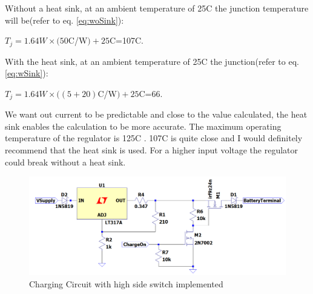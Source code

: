 Without a heat sink, at an ambient temperature of 25\textdegree C the junction temperature will be(refer to eq. \ref{eq:woSink}):

\begin{center}
$T_j=1.64W\times(50$\textdegree C/W$)+25$\textdegree C=107\textdegree C. 
\end{center}

With the heat sink, at an ambient temperature of 25\textdegree C the junction(refer to eq. \ref{eq:wSink}):
\begin{center}
    $T_j=1.64W\times((5+20)$\textdegree C/W$)+25$\textdegree C=66\textdegree.
\end{center}

We want out current to be predictable and close to the value calculated, the heat sink enables the calculation to be more accurate. The maximum operating temperature of the regulator is 125\textdegree C \cite{STM}. 107\textdegree C is quite close and I would definitely recommend that the heat sink is used. For a higher input voltage the regulator could break without a heat sink. 


\begin{figure}[!htb]
\centering
\includegraphics[scale=0.3]{Figures/FinCirc.png}
\caption{Charging Circuit with high side switch implemented }
\label{fig:circuit}
\end{figure}


